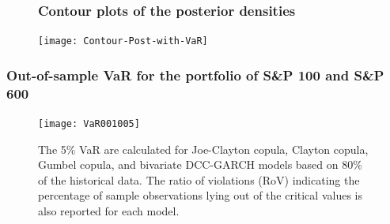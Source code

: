 \documentclass[10pt,aspectratio=43]{beamer}
\begin{document}
\begin{frame}
  \frametitle{}

  \begin{figure}[!h]
    \frametitle{Contour plots of the posterior densities}
    \centering
    \texttt{[image: Contour-Post-with-VaR]}
  \end{figure}

\end{frame}

\begin{frame}
  \frametitle{Out-of-sample VaR for the portfolio of S\&P 100 and S\&P 600}

  \begin{figure}[h!]
  \centering \texttt{[image: VaR001005]}
  \caption{The 5\% VaR are calculated for Joe-Clayton copula, Clayton copula, Gumbel
    copula, and bivariate DCC-GARCH models based on 80\% of the historical data. The ratio
    of violations (RoV) indicating the percentage of sample observations lying out of the
    critical values is also reported for each model.}
  \label{fig:VaR-plot}
\end{figure}
\end{frame}






\end{document}
